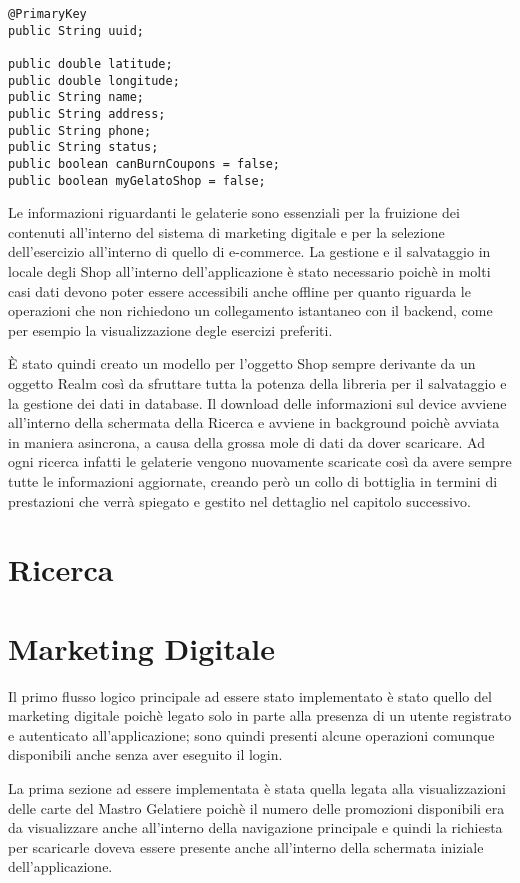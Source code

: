 \begin{lstlisting}
@PrimaryKey
public String uuid;

public double latitude;
public double longitude;
public String name;
public String address;
public String phone;
public String status;
public boolean canBurnCoupons = false;
public boolean myGelatoShop = false;
\end{lstlisting}
Le informazioni riguardanti le gelaterie sono essenziali per la fruizione
dei contenuti all'interno del sistema di marketing digitale e per
la selezione dell'esercizio all'interno di quello di e-commerce. La
gestione e il salvataggio in locale degli Shop all'interno dell'applicazione
è stato necessario poichè in molti casi dati devono poter essere accessibili
anche offline per quanto riguarda le operazioni che non richiedono
un collegamento istantaneo con il backend, come per esempio la visualizzazione
degle esercizi preferiti.

È stato quindi creato un modello per l'oggetto Shop sempre derivante
da un oggetto Realm così da sfruttare tutta la potenza della libreria
per il salvataggio e la gestione dei dati in database. Il download
delle informazioni sul device avviene all'interno della schermata
della Ricerca e avviene in background poichè avviata in maniera asincrona,
a causa della grossa mole di dati da dover scaricare. Ad ogni ricerca
infatti le gelaterie vengono nuovamente scaricate così da avere sempre
tutte le informazioni aggiornate, creando però un collo di bottiglia
in termini di prestazioni che verrà spiegato e gestito nel dettaglio
nel capitolo successivo.

\section{Ricerca}

\section{Marketing Digitale}

Il primo flusso logico principale ad essere stato implementato è stato
quello del marketing digitale poichè legato solo in parte alla presenza
di un utente registrato e autenticato all'applicazione; sono quindi
presenti alcune operazioni comunque disponibili anche senza aver eseguito
il login.

La prima sezione ad essere implementata è stata quella legata alla
visualizzazioni delle carte del Mastro Gelatiere poichè il numero
delle promozioni disponibili era da visualizzare anche all'interno
della navigazione principale e quindi la richiesta per scaricarle
doveva essere presente anche all'interno della schermata iniziale
dell'applicazione.

